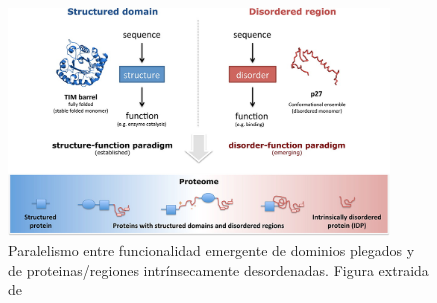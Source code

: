 \begin{figure}[h!,centered]
\centering
\includegraphics[width=0.9\textwidth]{img/structure-idp-function.jpeg} 
\caption{Paralelismo entre funcionalidad emergente de dominios plegados y de proteinas/regiones intrínsecamente desordenadas. Figura extraida de \cite{van2014classification}}
\label{stuctured-idp-functions}
\end{figure}




